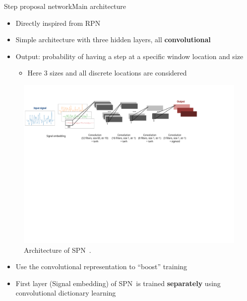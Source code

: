 \documentclass[9pt,t,aspectratio=1610]{beamer}
\newcommand{\subalgo}{{\small\textsc{SPN}}\ }
\begin{document}
\begin{frame}{Step proposal network}{Main architecture}

\begin{itemize}
    \item Directly inspired from RPN
    \item Simple architecture with three hidden layers, all \textbf{convolutional}
    \item Output: probability of having a step at a specific window location and size
    \begin{itemize}
    \item Here 3 sizes and all discrete locations are considered
    \end{itemize}
\end{itemize}

\begin{figure}[h]
    \begin{minipage}{\linewidth}
        \centering
        \includegraphics[width=\linewidth, trim= 0 340 120 40, clip]{schema_cnn_rpn}
        \caption{Architecture of \subalgo.}
        \label{fig:walk_class_cnn_spn}
    \end{minipage}
\end{figure}

\pause
\begin{itemize}
    \item Use the convolutional representation to ``boost'' training
    \item First layer (Signal embedding) of \subalgo is trained \textbf{separately} using convolutional dictionary learning
\end{itemize}
    
\end{frame}
\end{document}
